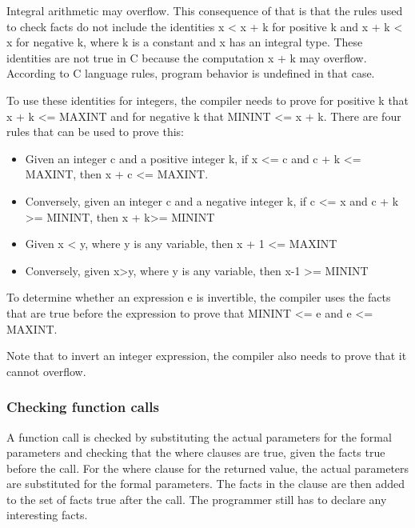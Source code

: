 \documentclass[]{article}
\begin{document}
Integral arithmetic may overflow. This consequence of that is that the
rules used to check facts do not include the identities x \textless{} x
+ k for positive k and x + k \textless{} x for negative k, where k is a
constant and x has an integral type. These identities are not true in C
because the computation x + k may overflow. According to C language
rules, program behavior is undefined in that case.

To use these identities for integers, the compiler needs to prove for
positive k that x + k \textless{}= MAXINT and for negative k that MININT
\textless{}= x + k. There are four rules that can be used to prove this:

\begin{itemize}
\item
  Given an integer c and a positive integer k, if x \textless{}= c and c
  + k \textless{}= MAXINT, then x + c \textless{}= MAXINT.
\item
  Conversely, given an integer c and a negative integer k, if c
  \textless{}= x and c + k \textgreater{}= MININT, then x +
  k\textgreater{}= MININT
\item
  Given x \textless{} y, where y is any variable, then x + 1
  \textless{}= MAXINT
\item
  Conversely, given x\textgreater{}y, where y is any variable, then x-1
  \textgreater{}= MININT
\end{itemize}

To determine whether an expression e is invertible, the compiler uses
the facts that are true before the expression to prove that MININT
\textless{}= e and e \textless{}= MAXINT.

Note that to invert an integer expression, the compiler also needs to
prove that it cannot overflow.

\subsubsection{\texorpdfstring{\protect\hypertarget{ux5fToc420589193}{}{\protect\hypertarget{ux5fRef421286795}{}{\protect\hypertarget{ux5fToc422906984}{}{\protect\hypertarget{ux5fToc424307724}{}{\protect\hypertarget{ux5fToc426641122}{}{\protect\hypertarget{ux5fToc435434997}{}{\protect\hypertarget{ux5fToc437460830}{}{\protect\hypertarget{ux5fToc440445511}{}{\protect\hypertarget{ux5fToc440449293}{}{\protect\hypertarget{ux5fToc440551943}{}{}}}}}}}}}}Checking
function calls}{Checking function calls}}\label{checking-function-calls}

A function call is checked by substituting the actual parameters for the
formal parameters and checking that the where clauses are true, given
the facts true before the call. For the where clause for the returned
value, the actual parameters are substituted for the formal parameters.
The facts in the clause are then added to the set of facts true after
the call. The programmer still has to declare any interesting facts.
\end{document}

